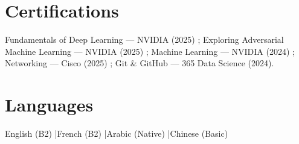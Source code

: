 \documentclass[a4paper,10pt]{article}
\begin{document}
\section{Certifications}
Fundamentals of Deep Learning — NVIDIA (2025) ; Exploring Adversarial Machine Learning — NVIDIA (2025) ; Machine Learning — NVIDIA (2024) ; Networking — Cisco (2025) ; Git \& GitHub — 365 Data Science (2024).

\section{Languages}
English (B2) \quad|\quad French (B2) \quad|\quad Arabic (Native) \quad|\quad Chinese (Basic)
\end{document}
